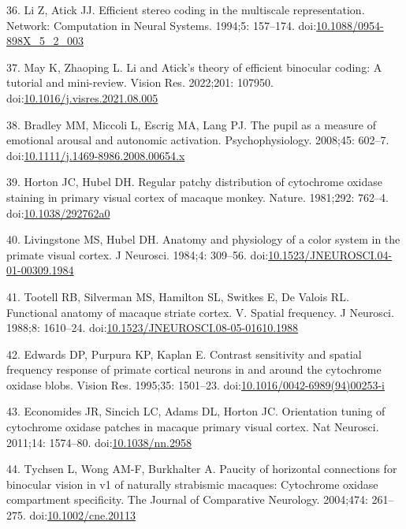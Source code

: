 \documentclass[
]{article}
\begin{document}
\leavevmode\hypertarget{ref-Li1994}{}%
36. Li Z, Atick JJ. Efficient stereo coding in the multiscale representation. Network: Computation in Neural Systems. 1994;5: 157--174. doi:\href{https://doi.org/10.1088/0954-898X_5_2_003}{10.1088/0954-898X\_5\_2\_003}

\leavevmode\hypertarget{ref-May2022}{}%
37. May K, Zhaoping L. Li and Atick's theory of efficient binocular coding: A tutorial and mini-review. Vision Res. 2022;201: 107950. doi:\href{https://doi.org/10.1016/j.visres.2021.08.005}{10.1016/j.visres.2021.08.005}

\leavevmode\hypertarget{ref-Bradley2008}{}%
38. Bradley MM, Miccoli L, Escrig MA, Lang PJ. The pupil as a measure of emotional arousal and autonomic activation. Psychophysiology. 2008;45: 602--7. doi:\href{https://doi.org/10.1111/j.1469-8986.2008.00654.x}{10.1111/j.1469-8986.2008.00654.x}

\leavevmode\hypertarget{ref-Horton1981}{}%
39. Horton JC, Hubel DH. Regular patchy distribution of cytochrome oxidase staining in primary visual cortex of macaque monkey. Nature. 1981;292: 762--4. doi:\href{https://doi.org/10.1038/292762a0}{10.1038/292762a0}

\leavevmode\hypertarget{ref-Livingstone1984}{}%
40. Livingstone MS, Hubel DH. Anatomy and physiology of a color system in the primate visual cortex. J Neurosci. 1984;4: 309--56. doi:\href{https://doi.org/10.1523/JNEUROSCI.04-01-00309.1984}{10.1523/JNEUROSCI.04-01-00309.1984}

\leavevmode\hypertarget{ref-Tootell1988}{}%
41. Tootell RB, Silverman MS, Hamilton SL, Switkes E, De Valois RL. Functional anatomy of macaque striate cortex. V. Spatial frequency. J Neurosci. 1988;8: 1610--24. doi:\href{https://doi.org/10.1523/JNEUROSCI.08-05-01610.1988}{10.1523/JNEUROSCI.08-05-01610.1988}

\leavevmode\hypertarget{ref-Edwards1995}{}%
42. Edwards DP, Purpura KP, Kaplan E. Contrast sensitivity and spatial frequency response of primate cortical neurons in and around the cytochrome oxidase blobs. Vision Res. 1995;35: 1501--23. doi:\href{https://doi.org/10.1016/0042-6989(94)00253-i}{10.1016/0042-6989(94)00253-i}

\leavevmode\hypertarget{ref-Economides2011}{}%
43. Economides JR, Sincich LC, Adams DL, Horton JC. Orientation tuning of cytochrome oxidase patches in macaque primary visual cortex. Nat Neurosci. 2011;14: 1574--80. doi:\href{https://doi.org/10.1038/nn.2958}{10.1038/nn.2958}

\leavevmode\hypertarget{ref-Tychsen2004}{}%
44. Tychsen L, Wong AM-F, Burkhalter A. Paucity of horizontal connections for binocular vision in v1 of naturally strabismic macaques: Cytochrome oxidase compartment specificity. The Journal of Comparative Neurology. 2004;474: 261--275. doi:\href{https://doi.org/10.1002/cne.20113}{10.1002/cne.20113}
\end{document}
